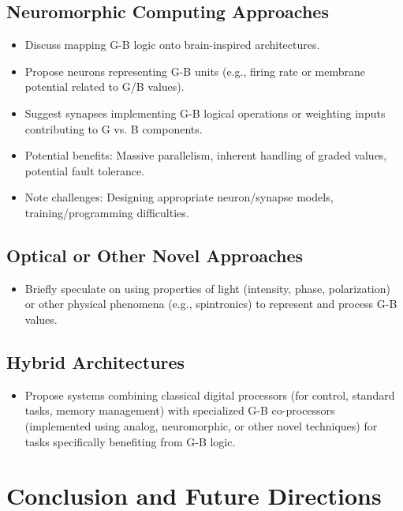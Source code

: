 \documentclass{article}
\begin{document}
\subsection{Neuromorphic Computing Approaches}
\begin{itemize}
    \item Discuss mapping G-B logic onto brain-inspired architectures.
    \item Propose neurons representing G-B units (e.g., firing rate or membrane potential related to G/B values).
    \item Suggest synapses implementing G-B logical operations or weighting inputs contributing to G vs. B components.
    \item Potential benefits: Massive parallelism, inherent handling of graded values, potential fault tolerance.
    \item Note challenges: Designing appropriate neuron/synapse models, training/programming difficulties.
\end{itemize}

\subsection{Optical or Other Novel Approaches}
\begin{itemize}
    \item Briefly speculate on using properties of light (intensity, phase, polarization) or other physical phenomena (e.g., spintronics) to represent and process G-B values.
\end{itemize}

\subsection{Hybrid Architectures}
\begin{itemize}
    \item Propose systems combining classical digital processors (for control, standard tasks, memory management) with specialized G-B co-processors (implemented using analog, neuromorphic, or other novel techniques) for tasks specifically benefiting from G-B logic.
\end{itemize}

\section{Conclusion and Future Directions}
\end{document}
